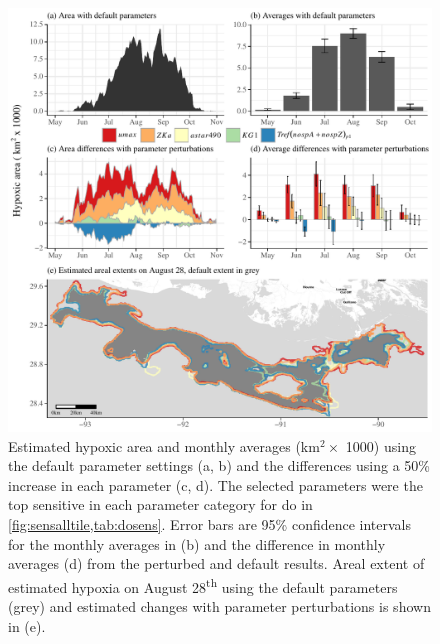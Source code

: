 \documentclass[review]{elsarticle}\usepackage[]{graphicx}\usepackage[]{color}
\newcommand{\beginsupplement}{%
        \setcounter{table}{0}
        \renewcommand{\thetable}{S\arabic{table}}%
        \setcounter{figure}{0}
        \renewcommand{\thefigure}{S\arabic{figure}}%
     }
\begin{document}
\begin{figure}[!ht]

{\centering \includegraphics[width=\textwidth]{figs/areachg-1} 

}

\caption{Estimated hypoxic area and monthly averages (km$^2 \times$ 1000) using the default parameter settings (a, b) and the differences using a 50\% increase in each parameter (c, d).  The selected parameters were the top sensitive in each parameter category for \ac{do} in \cref{fig:sensalltile,tab:dosens}. Error bars are 95\% confidence intervals for the monthly averages in (b) and the difference in monthly averages (d) from the perturbed and default results.  Areal extent of estimated hypoxia on August 28\textsuperscript{th} using the default parameters (grey) and estimated changes with parameter perturbations is shown in (e).}\label{fig:areachg}
\end{figure}



\clearpage

\beginsupplement

\end{document}
